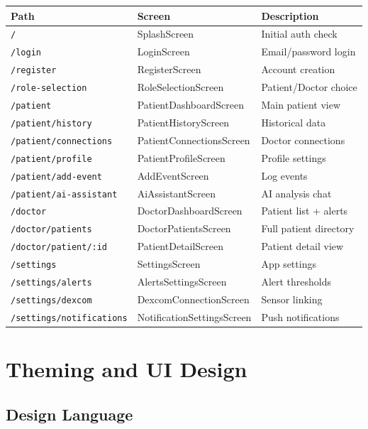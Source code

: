 \documentclass[12pt,a4paper]{article}
\begin{document}
\begin{longtable}{p{5cm} p{4.5cm} p{5cm}}
\toprule
\textbf{Path} & \textbf{Screen} & \textbf{Description} \\
\midrule
\endhead
\texttt{/} & SplashScreen & Initial auth check \\
\texttt{/login} & LoginScreen & Email/password login \\
\texttt{/register} & RegisterScreen & Account creation \\
\texttt{/role-selection} & RoleSelectionScreen & Patient/Doctor choice \\
\midrule
\texttt{/patient} & PatientDashboardScreen & Main patient view \\
\texttt{/patient/history} & PatientHistoryScreen & Historical data \\
\texttt{/patient/connections} & PatientConnectionsScreen & Doctor connections \\
\texttt{/patient/profile} & PatientProfileScreen & Profile settings \\
\texttt{/patient/add-event} & AddEventScreen & Log events \\
\texttt{/patient/ai-assistant} & AiAssistantScreen & AI analysis chat \\
\midrule
\texttt{/doctor} & DoctorDashboardScreen & Patient list + alerts \\
\texttt{/doctor/patients} & DoctorPatientsScreen & Full patient directory \\
\texttt{/doctor/patient/:id} & PatientDetailScreen & Patient detail view \\
\midrule
\texttt{/settings} & SettingsScreen & App settings \\
\texttt{/settings/alerts} & AlertsSettingsScreen & Alert thresholds \\
\texttt{/settings/dexcom} & DexcomConnectionScreen & Sensor linking \\
\texttt{/settings/notifications} & NotificationSettingsScreen & Push notifications \\
\bottomrule
\end{longtable}

\section{Theming and UI Design}

\subsection{Design Language}
\end{document}
